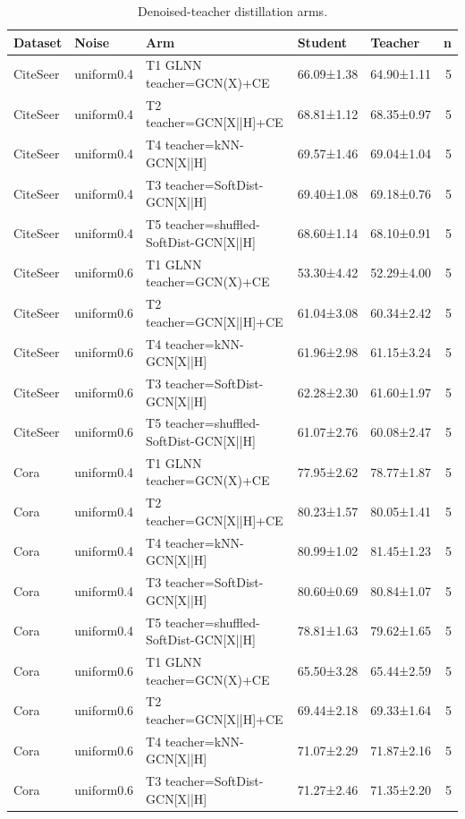 \begin{table}[t]
\centering
\caption{Denoised-teacher distillation arms.}
\label{tab:distill-arms}
\begin{tabular}{lllllr}
\toprule
Dataset & Noise & Arm & Student & Teacher & n \\
\midrule
CiteSeer & uniform0.4 & T1 GLNN teacher=GCN(X)+CE & 66.09±1.38 & 64.90±1.11 & 5 \\
CiteSeer & uniform0.4 & T2 teacher=GCN[X||H]+CE & 68.81±1.12 & 68.35±0.97 & 5 \\
CiteSeer & uniform0.4 & T4 teacher=kNN-GCN[X||H] & 69.57±1.46 & 69.04±1.04 & 5 \\
CiteSeer & uniform0.4 & T3 teacher=SoftDist-GCN[X||H] & 69.40±1.08 & 69.18±0.76 & 5 \\
CiteSeer & uniform0.4 & T5 teacher=shuffled-SoftDist-GCN[X||H] & 68.60±1.14 & 68.10±0.91 & 5 \\
CiteSeer & uniform0.6 & T1 GLNN teacher=GCN(X)+CE & 53.30±4.42 & 52.29±4.00 & 5 \\
CiteSeer & uniform0.6 & T2 teacher=GCN[X||H]+CE & 61.04±3.08 & 60.34±2.42 & 5 \\
CiteSeer & uniform0.6 & T4 teacher=kNN-GCN[X||H] & 61.96±2.98 & 61.15±3.24 & 5 \\
CiteSeer & uniform0.6 & T3 teacher=SoftDist-GCN[X||H] & 62.28±2.30 & 61.60±1.97 & 5 \\
CiteSeer & uniform0.6 & T5 teacher=shuffled-SoftDist-GCN[X||H] & 61.07±2.76 & 60.08±2.47 & 5 \\
Cora & uniform0.4 & T1 GLNN teacher=GCN(X)+CE & 77.95±2.62 & 78.77±1.87 & 5 \\
Cora & uniform0.4 & T2 teacher=GCN[X||H]+CE & 80.23±1.57 & 80.05±1.41 & 5 \\
Cora & uniform0.4 & T4 teacher=kNN-GCN[X||H] & 80.99±1.02 & 81.45±1.23 & 5 \\
Cora & uniform0.4 & T3 teacher=SoftDist-GCN[X||H] & 80.60±0.69 & 80.84±1.07 & 5 \\
Cora & uniform0.4 & T5 teacher=shuffled-SoftDist-GCN[X||H] & 78.81±1.63 & 79.62±1.65 & 5 \\
Cora & uniform0.6 & T1 GLNN teacher=GCN(X)+CE & 65.50±3.28 & 65.44±2.59 & 5 \\
Cora & uniform0.6 & T2 teacher=GCN[X||H]+CE & 69.44±2.18 & 69.33±1.64 & 5 \\
Cora & uniform0.6 & T4 teacher=kNN-GCN[X||H] & 71.07±2.29 & 71.87±2.16 & 5 \\
Cora & uniform0.6 & T3 teacher=SoftDist-GCN[X||H] & 71.27±2.46 & 71.35±2.20 & 5 \\

\end{tabular}
\end{table}
